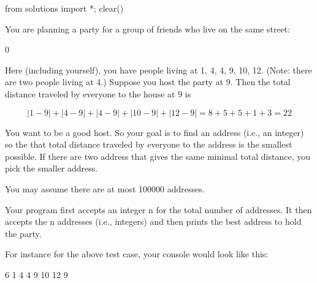 \begin{python0}
from solutions import *; clear()
\end{python0}

You are planning a party for a group of friends who live on the same
street:


\begin{center}
0            
\end{center}

Here (including yourself), you have people living at 1, 4, 4, 9, 10, 12. (Note: there are two people living at 4.) Suppose you host the party at 9. Then the total distance traveled by everyone to the house at 9 is
\begin{center}
\[|1 - 9| + |4 - 9| + |4 - 9| + |10 - 9| + |12 - 9| = 8 + 5 + 5 + 1 + 3 = 22\]
\end{center}
You want to be a good host. So your goal is to find an address (i.e., an integer) so the that total distance traveled by everyone to the address is the smallest possible. If there are two address that gives the same minimal total distance, you pick the smaller address.

You may assume there are at most 100000 addresses.

Your program first accepts an integer n for the total number of
addresses. It then accepts the n addresses (i.e., integers) and then
prints the best address to hold the party.

For instance for the above test case, your console would look like this:

\begin{consolethree}[escapeinside=||]
6
1 4 4 9 10 12
9
\end{consolethree}

